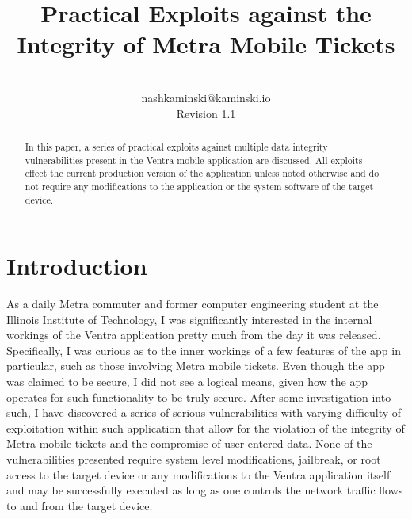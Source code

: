 \documentclass[12pt,conference]{IEEEtran}
\begin{document}
%
\title{Practical Exploits against the Integrity of Metra Mobile Tickets}

\author{\\
nashkaminski@kaminski.io\\
Revision 1.1
}


\maketitle


\begin{abstract}
In this paper, a series of practical exploits against multiple data integrity vulnerabilities present in the Ventra mobile application are discussed. All exploits effect the current production version of the application unless noted otherwise and do not require any modifications to the application or the system software of the target device.
\end{abstract}




\section{Introduction}
As a daily Metra commuter and former computer engineering student at the Illinois Institute of Technology, I was significantly interested in the internal workings of the Ventra application pretty much from the day it was released. Specifically, I was curious as to the inner workings of a few features of the app in particular, such as those involving Metra mobile tickets. Even though the app was claimed to be secure, I did not see a logical means, given how the app operates for such functionality to be truly secure. After some investigation into such, I have discovered a series of serious vulnerabilities with varying difficulty of exploitation within such application that allow for the violation of the integrity of Metra mobile tickets and the compromise of user-entered data. None of the vulnerabilities presented require system level modifications, jailbreak, or root access to the target device or any modifications to the Ventra application itself and may be successfully executed as long as one controls the network traffic flows to and from the target device.
\end{document}
